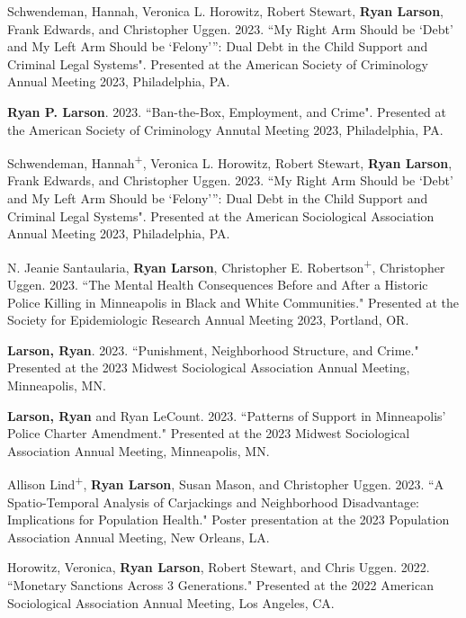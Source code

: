 \documentclass[letterpaper]{article}
\renewenvironment{itemize}{
  \begin{list}{}{
    \setlength{\leftmargin}{1.5em}
  }
}{
  \end{list}
}
\begin{document}
\begin{itemize}
\item Schwendeman, Hannah, Veronica L. Horowitz, Robert Stewart, \textbf{Ryan Larson}, Frank Edwards, and Christopher Uggen. 2023. ``My Right Arm Should be ‘Debt’ and My Left Arm Should be ‘Felony’”:
Dual Debt in the Child Support and Criminal Legal Systems". Presented at the American Society of Criminology Annual Meeting 2023, Philadelphia, PA. 

\item \textbf{Ryan P. Larson}. 2023. ``Ban-the-Box, Employment, and Crime". Presented at the American Society of Criminology Annutal Meeting 2023, Philadelphia, PA. 

\item Schwendeman, Hannah\textsuperscript{+}, Veronica L. Horowitz, Robert Stewart, \textbf{Ryan Larson}, Frank Edwards, and Christopher Uggen. 2023. ``My Right Arm Should be ‘Debt’ and My Left Arm Should be ‘Felony’”:
Dual Debt in the Child Support and Criminal Legal Systems". Presented at the American Sociological Association Annual Meeting 2023, Philadelphia, PA. 

\item N. Jeanie Santaularia, \textbf{Ryan Larson}, Christopher E. Robertson\textsuperscript{+}, Christopher Uggen. 2023. ``The Mental Health Consequences Before and After a Historic Police Killing in Minneapolis in Black and White Communities." Presented at the Society for Epidemiologic Research Annual Meeting 2023, Portland, OR.

\item \textbf{Larson, Ryan}. 2023. ``Punishment, Neighborhood Structure, and Crime." Presented at the 2023 Midwest Sociological Association Annual Meeting, Minneapolis, MN. 

\item \textbf{Larson, Ryan} and Ryan LeCount. 2023. ``Patterns of Support in Minneapolis’ Police Charter Amendment." Presented at the 2023 Midwest Sociological Association Annual Meeting, Minneapolis, MN. 

\item Allison Lind\textsuperscript{+}, \textbf{Ryan Larson}, Susan Mason, and Christopher Uggen. 2023. ``A Spatio-Temporal Analysis of Carjackings and Neighborhood Disadvantage: Implications for Population Health." Poster presentation at the 2023 Population Association Annual Meeting, New Orleans, LA. 

\item Horowitz, Veronica, \textbf{Ryan Larson}, Robert Stewart, and Chris Uggen. 2022.  ``Monetary Sanctions Across 3 Generations." Presented at the 2022 American Sociological Association Annual Meeting, Los Angeles, CA. 


\end{itemize}
\end{document}
